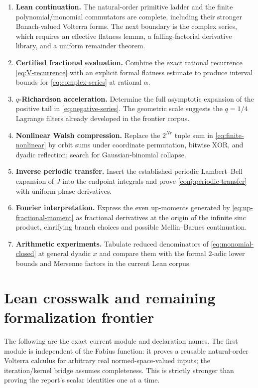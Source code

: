 \documentclass[11pt,oneside]{article}
\numberwithin{equation}{section}
\theoremstyle{definition}
\theoremstyle{remark}
\newcommand{\InvF}{J}
\begin{document}
\begin{enumerate}
\item \textbf{Lean continuation.}  The natural-order primitive ladder and the
finite polynomial/monomial commutators are complete, including their stronger
Banach-valued Volterra forms.  The next boundary is the complex series, which
requires an effective flatness lemma, a falling-factorial derivative library,
and a uniform remainder theorem.
\item \textbf{Certified fractional evaluation.}  Combine the exact rational recurrence \eqref{eq:V-recurrence} with an
explicit formal flatness estimate to produce interval bounds for
\eqref{eq:complex-series} at rational $\alpha$.
\item \textbf{$q$-Richardson acceleration.}  Determine the full asymptotic
expansion of the positive tail in \eqref{eq:negative-series}.  The geometric
scale suggests the $q=1/4$ Lagrange filters already developed in the frontier
corpus.
\item \textbf{Nonlinear Walsh compression.}  Replace the $2^{Nr}$ tuple sum in
\eqref{eq:finite-nonlinear} by orbit sums under coordinate permutation,
bitwise XOR, and dyadic reflection; search for Gaussian-binomial collapse.
\item \textbf{Inverse periodic transfer.}  Insert the established periodic
Lambert--Bell expansion of $\InvF$ into the endpoint integrals and prove
\cref{conj:periodic-transfer} with uniform phase derivatives.
\item \textbf{Fourier interpretation.}  Express the even up-moments generated
by \eqref{eq:up-fractional-moment} as fractional derivatives at the origin of
the infinite sinc product, clarifying branch choices and possible Mellin--Barnes
continuation.
\item \textbf{Arithmetic experiments.}  Tabulate reduced denominators of
\eqref{eq:monomial-closed} at general dyadic $x$ and compare them with the
formal $2$-adic lower bounds and Mersenne factors in the current Lean corpus.
\end{enumerate}

\section{Lean crosswalk and remaining formalization frontier}
\label{sec:lean-roadmap}

The following are the exact current module and declaration names.  The first
module is independent of the Fabius function: it proves a reusable
natural-order Volterra calculus for arbitrary real normed-space-valued inputs;
the iteration/kernel bridge assumes completeness.  This is strictly stronger
than proving the report's scalar identities one at a time.
\end{document}
